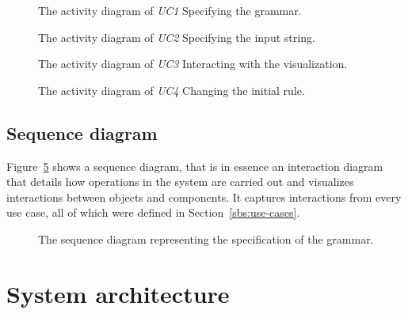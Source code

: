 \documentclass[english,bachelors,forcepolishlogotype]{wizthesis}
\begin{document}
\begin{figure}[H]
  \centering
  \resizebox{!}{5cm}{\footnotesize}
  \caption{The activity diagram of \emph{UC1} Specifying the grammar.}
  \label{fig:uc1-activity-diagram}
\end{figure}

\begin{figure}[H]
  \centering
  \resizebox{!}{5cm}{\footnotesize}
  \caption{The activity diagram of \emph{UC2} Specifying the input string.}
  \label{fig:uc2-activity-diagram}
\end{figure}

\begin{figure}[H]
  \centering
  \resizebox{!}{5cm}{\footnotesize}
  \caption{The activity diagram of \emph{UC3} Interacting with the
  \label{fig:uc3-activity-diagram}
  visualization.}
\end{figure}

\begin{figure}[H]
  \centering
  \resizebox{!}{5cm}{\footnotesize}
  \caption{The activity diagram of \emph{UC4} Changing the initial rule.}
  \label{fig:uc4-activity-diagram}
\end{figure}

\subsection{Sequence diagram}

Figure~\ref{fig:sequence-diagram} shows a sequence diagram, that is in essence
an interaction diagram that details how operations in the system are carried out
and visualizes interactions between objects and components. It captures
interactions from every use case, all of which were defined in
Section~\ref{sbs:use-cases}.

\begin{figure}[H]
  \centering
  \resizebox{0.65\textwidth}{!}{\footnotesize}
  \caption{The sequence diagram representing the specification of the grammar.}
  \label{fig:sequence-diagram}
\end{figure}

\newpage

\section{System architecture} \label{sec:system-architecture}
\end{document}
